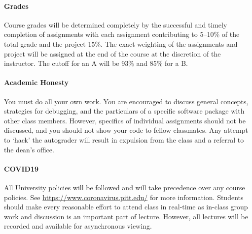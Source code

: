 \documentclass[11pt,letterpaper,oneside]{article}
\begin{document}
\paragraph*{Grades}  Course grades will be determined completely by the successful and timely completion of assignments with each assignment contributing to 5--10\% 
of the total grade and the project 15\%.  The exact weighting of the assignments and project will be assigned at the end of the course at the discretion of the instructor. The cutoff for an A will be 93\% and 85\% for a B.

\paragraph*{Academic Honesty}  You must do all your own work.  You are encouraged to discuss general concepts, strategies for debugging, and the particulars of a specific software package with other class members.  However, specifics of individual assignments should not be discussed, and you should not show your code to fellow classmates.  Any attempt to `hack' the autograder will result in expulsion from the class and a referral to the dean's office.

\paragraph*{COVID19}  All University policies will be followed and will take precedence over any course policies.  See \url{https://www.coronavirus.pitt.edu/} for more information.    Students should make every reasonable effort to attend class in real-time as in-class group work and discussion is an important part of lecture.  However, all lectures will be recorded and available for asynchronous viewing.
\end{document}

